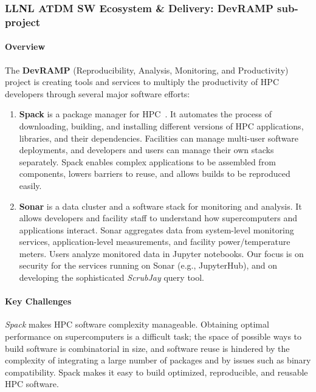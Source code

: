 \subsubsection{ LLNL ATDM SW Ecosystem \& Delivery: DevRAMP sub-project}

\paragraph{Overview} The {\bf DevRAMP} (Reproducibility, Analysis,
Monitoring, and Productivity) project is creating tools and services to
multiply the productivity of HPC developers through several major
software efforts:

\begin{enumerate}
    \item {\bf Spack} is a package manager for
    HPC~\cite{melara+:cug17,gamblin+:sc18-spack-tutorial,gamblin+:sc18-spack-bof,gamblin+:sc17-spack-tutorial,gamblin+:sc16-spack-tutorial,gamblin+:sc15,gamblin+:llnl-spack-tutorial-17,gamblin+:ecp18-spack-tutorial,gamblin:pp18-spack,gamblin:hpckp17,gamblin:fosdem18-compilers,gamblin:fosdem18-binary,gamblin:ecp18-spack-sotu,gamblin:eb-user-meeting18,becker+:hust16}.
    It automates the process of downloading, building, and installing
    different versions of HPC applications, libraries, and their
    dependencies.  Facilities can manage multi-user software deployments,
    and developers and users can manage their own stacks separately.
    Spack enables complex applications to be assembled from components,
    lowers barriers to reuse, and allows builds to be reproduced easily.

    \item {\bf Sonar} is a data cluster and a software stack for
    monitoring and analysis. It allows developers and facility staff to
    understand how supercomputers and applications interact. Sonar
    aggregates data from system-level monitoring services,
    application-level measurements, and facility power/temperature
    meters. Users analyze monitored data in Jupyter notebooks. Our focus
    is on security for the services running on Sonar (e.g., JupyterHub),
    and on developing the sophisticated {\it ScrubJay} query tool.
\end{enumerate}

\paragraph{Key Challenges}
{\it Spack} makes HPC software complexity manageable. Obtaining optimal
performance on supercomputers is a difficult task; the space of possible
ways to build software is combinatorial in size, and software reuse is
hindered by the complexity of integrating a large number of packages and
by issues such as binary compatibility.  Spack makes it easy to build
optimized, reproducible, and reusable HPC software.

